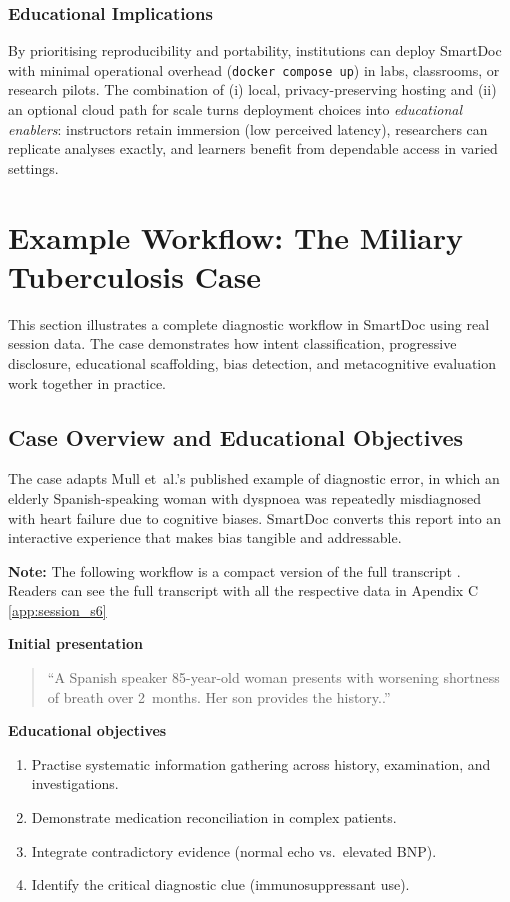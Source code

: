 \subsubsection{Educational Implications}
By prioritising reproducibility and portability, institutions can deploy SmartDoc with minimal operational overhead (\texttt{docker compose up}) in labs, classrooms, or research pilots. The combination of (i) local, privacy-preserving hosting and (ii) an optional cloud path for scale turns deployment choices into \emph{educational enablers}: instructors retain immersion (low perceived latency), researchers can replicate analyses exactly, and learners benefit from dependable access in varied settings.

\section{Example Workflow: The Miliary Tuberculosis Case}
\label{sec:mtb_workflow}

This section illustrates a complete diagnostic workflow in SmartDoc using real session data. The case demonstrates how intent classification, progressive disclosure, educational scaffolding, bias detection, and metacognitive evaluation work together in practice.

\subsection{Case Overview and Educational Objectives}

The case adapts Mull et~al.'s\cite{mull_cognitive_2015} published example of diagnostic error, in which an elderly Spanish-speaking woman with dyspnoea was repeatedly misdiagnosed with heart failure due to cognitive biases. SmartDoc converts this report into an interactive experience that makes bias tangible and addressable.

\textbf{Note:} The following workflow is a compact version of the full transcript . Readers can see the full transcript with all the respective data in Apendix C  \ref{app:session_s6}

\noindent\textbf{Initial presentation}
\begin{quote}
``A Spanish speaker 85-year-old woman presents with worsening shortness of breath over 2~months. Her son provides the history..''
\end{quote}

\noindent\textbf{Educational objectives}
\begin{enumerate}
  \item Practise systematic information gathering across history, examination, and investigations.
  \item Demonstrate medication reconciliation in complex patients.
  \item Integrate contradictory evidence (normal echo vs.\ elevated BNP).
  \item Identify the critical diagnostic clue (immunosuppressant use).
\end{enumerate}

